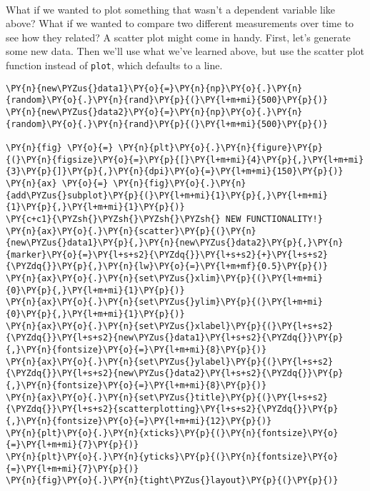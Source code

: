     \begin{center}
    \end{center}
    { \hspace*{\fill} \\}
    
    What if we wanted to plot something that wasn't a dependent variable
like above? What if we wanted to compare two different measurements over
time to see how they related? A scatter plot might come in handy. First,
let's generate some new data. Then we'll use what we've learned above,
but use the scatter plot function instead of \texttt{plot}, which
defaults to a line.

    \begin{tcolorbox}[breakable, size=fbox, boxrule=1pt, pad at break*=1mm,colback=cellbackground, colframe=cellborder]
\begin{Verbatim}[commandchars=\\\{\}]
\PY{n}{new\PYZus{}data1}\PY{o}{=}\PY{n}{np}\PY{o}{.}\PY{n}{random}\PY{o}{.}\PY{n}{rand}\PY{p}{(}\PY{l+m+mi}{500}\PY{p}{)}
\PY{n}{new\PYZus{}data2}\PY{o}{=}\PY{n}{np}\PY{o}{.}\PY{n}{random}\PY{o}{.}\PY{n}{rand}\PY{p}{(}\PY{l+m+mi}{500}\PY{p}{)}

\PY{n}{fig} \PY{o}{=} \PY{n}{plt}\PY{o}{.}\PY{n}{figure}\PY{p}{(}\PY{n}{figsize}\PY{o}{=}\PY{p}{[}\PY{l+m+mi}{4}\PY{p}{,}\PY{l+m+mi}{3}\PY{p}{]}\PY{p}{,}\PY{n}{dpi}\PY{o}{=}\PY{l+m+mi}{150}\PY{p}{)} 
\PY{n}{ax} \PY{o}{=} \PY{n}{fig}\PY{o}{.}\PY{n}{add\PYZus{}subplot}\PY{p}{(}\PY{l+m+mi}{1}\PY{p}{,}\PY{l+m+mi}{1}\PY{p}{,}\PY{l+m+mi}{1}\PY{p}{)}
\PY{c+c1}{\PYZsh{}\PYZsh{}\PYZsh{}\PYZsh{} NEW FUNCTIONALITY!}
\PY{n}{ax}\PY{o}{.}\PY{n}{scatter}\PY{p}{(}\PY{n}{new\PYZus{}data1}\PY{p}{,}\PY{n}{new\PYZus{}data2}\PY{p}{,}\PY{n}{marker}\PY{o}{=}\PY{l+s+s2}{\PYZdq{}}\PY{l+s+s2}{+}\PY{l+s+s2}{\PYZdq{}}\PY{p}{,}\PY{n}{lw}\PY{o}{=}\PY{l+m+mf}{0.5}\PY{p}{)}
\PY{n}{ax}\PY{o}{.}\PY{n}{set\PYZus{}xlim}\PY{p}{(}\PY{l+m+mi}{0}\PY{p}{,}\PY{l+m+mi}{1}\PY{p}{)}
\PY{n}{ax}\PY{o}{.}\PY{n}{set\PYZus{}ylim}\PY{p}{(}\PY{l+m+mi}{0}\PY{p}{,}\PY{l+m+mi}{1}\PY{p}{)}
\PY{n}{ax}\PY{o}{.}\PY{n}{set\PYZus{}xlabel}\PY{p}{(}\PY{l+s+s2}{\PYZdq{}}\PY{l+s+s2}{new\PYZus{}data1}\PY{l+s+s2}{\PYZdq{}}\PY{p}{,}\PY{n}{fontsize}\PY{o}{=}\PY{l+m+mi}{8}\PY{p}{)}
\PY{n}{ax}\PY{o}{.}\PY{n}{set\PYZus{}ylabel}\PY{p}{(}\PY{l+s+s2}{\PYZdq{}}\PY{l+s+s2}{new\PYZus{}data2}\PY{l+s+s2}{\PYZdq{}}\PY{p}{,}\PY{n}{fontsize}\PY{o}{=}\PY{l+m+mi}{8}\PY{p}{)}
\PY{n}{ax}\PY{o}{.}\PY{n}{set\PYZus{}title}\PY{p}{(}\PY{l+s+s2}{\PYZdq{}}\PY{l+s+s2}{scatterplotting}\PY{l+s+s2}{\PYZdq{}}\PY{p}{,}\PY{n}{fontsize}\PY{o}{=}\PY{l+m+mi}{12}\PY{p}{)}
\PY{n}{plt}\PY{o}{.}\PY{n}{xticks}\PY{p}{(}\PY{n}{fontsize}\PY{o}{=}\PY{l+m+mi}{7}\PY{p}{)}
\PY{n}{plt}\PY{o}{.}\PY{n}{yticks}\PY{p}{(}\PY{n}{fontsize}\PY{o}{=}\PY{l+m+mi}{7}\PY{p}{)}
\PY{n}{fig}\PY{o}{.}\PY{n}{tight\PYZus{}layout}\PY{p}{(}\PY{p}{)}
\end{Verbatim}
\end{tcolorbox}

